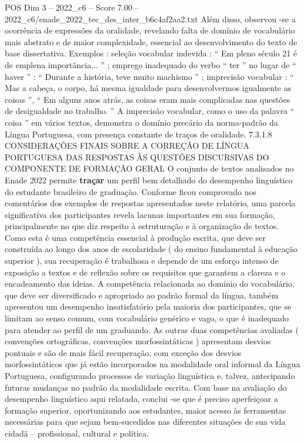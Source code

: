 \begin{textsample}{POS Dim 3 – 2022\_c6 – Score 7.00 – 2022\_c6/enade\_2022\_tec\_des\_inter\_b6c4af2aa2.txt}
Além disso, observou -se a ocorrência de expressões da oralidade, revelando falta de domínio de vocabulário mais abstrato e de maior complexidade, essencial ao desenvolvimento do texto de base dissertativa.
Exemplos : seleção vocabular indevida : “ Em pleno século 21 é de emplena importância... ” ; emprego inadequado do verbo “ ter ” no lugar de “ haver ” : “ Durante a história, teve muito machismo ” ; imprecisão vocabular : “ Mas a cabeça, o corpo, há mesma igualdade para desenvolvermos igualmente as coisas ”, “ Em alguns anos atrás, as coisas eram mais complicadas nas questões de desigualdade no trabalho. ” A imprecisão vocabular, como o uso da palavra “ coisa ” em vários textos, demonstra o domínio precário da norma-padrão da Língua Portuguesa, com presença constante de traços de oralidade. 7.3.1.8 CONSIDERAÇÕES FINAIS SOBRE A CORREÇÃO DE LÍNGUA PORTUGUESA DAS RESPOSTAS ÀS QUESTÕES DISCURSIVAS DO COMPONENTE DE FORMAÇÃO GERAL O conjunto de textos analisados no Enade 2022 permite \textbf{traçar} um perfil bem detalhado do desempenho linguístico do estudante brasileiro de graduação.
Conforme ficou comprovado nos comentários dos exemplos de respostas apresentados neste relatório, uma parcela significativa dos participantes revela lacunas importantes em sua formação, principalmente no que diz respeito à estruturação e à organização de textos.
Como esta é uma competência essencial à produção escrita, que deve ser construída ao longo dos anos de escolaridade ( do ensino fundamental à educação superior ), sua recuperação é trabalhosa e depende de um esforço intenso de exposição a textos e de reflexão sobre os requisitos que garantem a clareza e o encadeamento das ideias.
A competência relacionada ao domínio do vocabulário, que deve ser diversificado e apropriado ao padrão formal da língua, também apresentou um desempenho insatisfatório pela maioria dos participantes, que se limitam ao senso comum, com vocabulário genérico e vago, o que é inadequado para atender ao perfil de um graduando.
As outras duas competências avaliadas ( convenções ortográficas, convenções morfossintáticas ) apresentam desvios pontuais e são de mais fácil recuperação, com exceção dos desvios morfossintáticos que já estão incorporados na modalidade oral informal da Língua Portuguesa, configurando processos de variação linguística e, talvez, antecipando futuras mudanças no padrão da modalidade escrita.
Com base na avaliação do desempenho linguístico aqui relatada, conclui -se que é preciso aperfeiçoar a formação superior, oportunizando aos estudantes, maior acesso às ferramentas necessárias para que sejam bem-sucedidos nas diferentes situações de sua vida cidadã – profissional, cultural e política.

\end{textsample}
